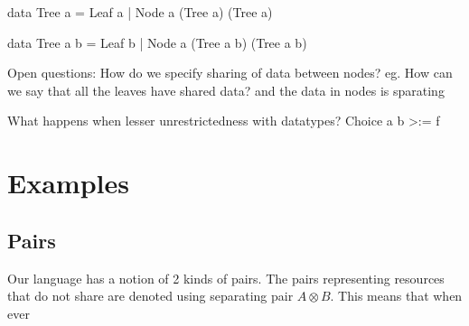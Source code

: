 data Tree a = Leaf a | Node a (Tree a) (Tree a)

data Tree a b = Leaf b | Node a (Tree a b) (Tree a b)

Open questions:
How do we specify sharing of data between nodes?
eg. How can we say that all the leaves have shared data? and the data in nodes is sparating


What happens when lesser unrestrictedness with datatypes? Choice a b >:= f


\section{Examples}

\subsection{Pairs}

Our language has a notion of 2 kinds of pairs. The pairs representing resources that do not share
are denoted using separating pair $A \otimes B$. This means that when ever 



